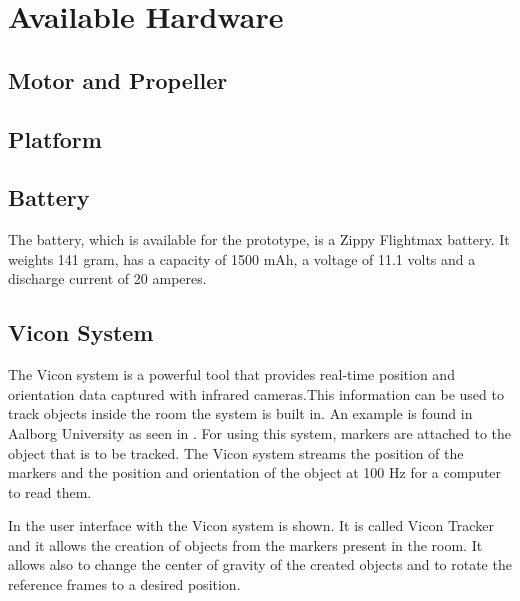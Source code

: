 \section{Available Hardware}

\subsection{Motor and Propeller}

\subsection{Platform}

\subsection{Battery}

The battery, which is available for the prototype, is a Zippy Flightmax battery. It weights 141 gram, has a capacity of 1500 mAh, a voltage of 11.1 volts and a discharge current of 20 amperes. 

\subsection{Vicon System}

The Vicon system is a powerful tool that provides real-time position and orientation data captured with infrared cameras.This information can be used to track objects inside the room the system is built in. An example is found in Aalborg University as seen in . 
For using this system, markers are attached to the object that is to be tracked. The Vicon system streams the position of the markers and the position and orientation of the object at 100 Hz for a computer to read them.

In  the user interface with the Vicon system is shown. It is called Vicon Tracker and it allows the creation of objects from the markers present in the room. It allows also to change the center of gravity of the created objects and to rotate the reference frames to a desired position.
